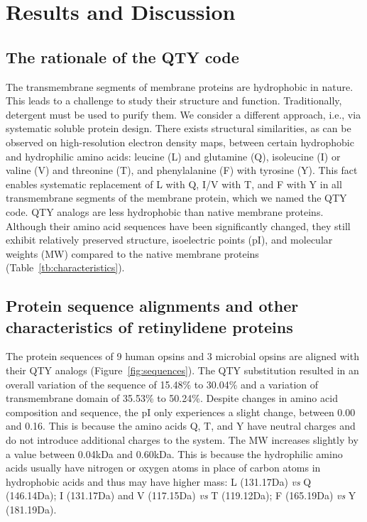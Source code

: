 \documentclass[fleqn, 10pt, lineno]{manuscript}
\begin{document}
\section*{Results and Discussion}

\subsection*{The rationale of the QTY code}

The transmembrane segments of membrane proteins are hydrophobic in nature. This leads to a challenge to study their structure and function. Traditionally, detergent must be used to purify them. We consider a different approach, i.e., via systematic soluble protein design. There exists structural similarities, as can be observed on high-resolution electron density maps, between certain hydrophobic and hydrophilic amino acids: leucine (L) and glutamine (Q), isoleucine (I) or valine (V) and threonine (T), and phenylalanine (F) with tyrosine (Y). This fact enables systematic replacement of L with Q, I/V with T, and F with Y in all transmembrane segments of the membrane protein, which we named the QTY code. QTY analogs are less hydrophobic than native membrane proteins. Although their amino acid sequences have been significantly changed, they still exhibit relatively preserved structure, isoelectric points (pI), and molecular weights (MW) compared to the native membrane proteins (Table~\ref{tb:characteristics}). 

\subsection*{Protein sequence alignments and other characteristics of retinylidene proteins}

The protein sequences of 9 human opsins and 3 microbial opsins are aligned with their QTY analogs (Figure~\ref{fig:sequences}). The QTY substitution resulted in an overall variation of the sequence of 15.48\% to 30.04\% and a variation of transmembrane domain of 35.53\% to 50.24\%. Despite changes in amino acid composition and sequence, the pI only experiences a slight change, between 0.00 and 0.16. This is because the amino acids Q, T, and Y have neutral charges and do not introduce additional charges to the system.  The MW increases slightly by a value between 0.04kDa and 0.60kDa. This is because the hydrophilic amino acids usually have nitrogen or oxygen atoms in place of carbon atoms in hydrophobic acids and thus may have higher mass: L (131.17Da) \textit{vs} Q (146.14Da); I (131.17Da) and V (117.15Da) \textit{vs} T (119.12Da); F (165.19Da) \textit{vs} Y (181.19Da). 
\end{document}

